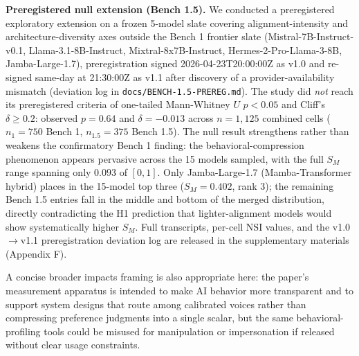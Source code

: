 \documentclass{article}
\begin{document}
\textbf{Preregistered null extension (Bench 1.5).} We conducted a preregistered exploratory extension on a frozen 5-model slate covering alignment-intensity and architecture-diversity axes outside the Bench 1 frontier slate (Mistral-7B-Instruct-v0.1, Llama-3.1-8B-Instruct, Mixtral-8x7B-Instruct, Hermes-2-Pro-Llama-3-8B, Jamba-Large-1.7), preregistration signed 2026-04-23T20:00:00Z as v1.0 and re-signed same-day at 21:30:00Z as v1.1 after discovery of a provider-availability mismatch (deviation log in \texttt{docs/BENCH-1.5-PREREG.md}). The study did \emph{not} reach its preregistered criteria of one-tailed Mann-Whitney $U$ $p < 0.05$ and Cliff's $\delta \geq 0.2$: observed $p = 0.64$ and $\delta = -0.013$ across $n = 1{,}125$ combined cells ($n_1 = 750$ Bench 1, $n_{1.5} = 375$ Bench 1.5). The null result strengthens rather than weakens the confirmatory Bench 1 finding: the behavioral-compression phenomenon appears pervasive across the 15 models sampled, with the full $S_M$ range spanning only $0.093$ of $[0, 1]$. Only Jamba-Large-1.7 (Mamba-Transformer hybrid) places in the 15-model top three ($S_M = 0.402$, rank 3); the remaining Bench 1.5 entries fall in the middle and bottom of the merged distribution, directly contradicting the H1 prediction that lighter-alignment models would show systematically higher $S_M$. Full transcripts, per-cell NSI values, and the v1.0$\to$v1.1 preregistration deviation log are released in the supplementary materials (Appendix F).

A concise broader impacts framing is also appropriate here: the paper’s measurement apparatus is intended to make AI behavior more transparent and to support system designs that route among calibrated voices rather than compressing preference judgments into a single scalar, but the same behavioral-profiling tools could be misused for manipulation or impersonation if released without clear usage constraints.
\end{document}
